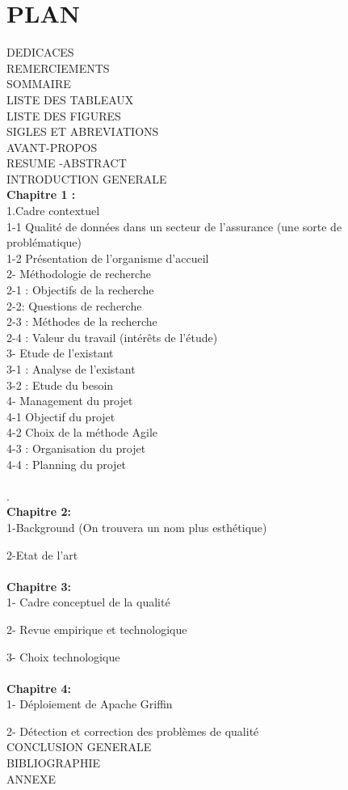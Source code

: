\documentclass[12pt,a4paper, fleqn]{report}
\begin{document}
\chapter*{PLAN}
DEDICACES\\
REMERCIEMENTS\\
SOMMAIRE\\
LISTE DES TABLEAUX\\
LISTE DES FIGURES\\
SIGLES ET ABREVIATIONS\\
AVANT-PROPOS\\
RESUME -ABSTRACT\\
INTRODUCTION GENERALE\\
\textbf{Chapitre 1 :}\\

1.Cadre contextuel\\
1-1 Qualité de données dans un secteur de l'assurance (une sorte de problématique)\\
1-2 Présentation de l'organisme d’accueil\\

2- Méthodologie de recherche\\                                          
2-1 : Objectifs de la recherche\\
2-2:  Questions de recherche\\
2-3 : Méthodes de la recherche\\
2-4 : Valeur du travail (intérêts de l’étude)\\

3- Etude de l'existant\\
3-1 : Analyse de l'existant\\
3-2 : Etude du besoin\\

4- Management du projet\\                                                                 
4-1 Objectif du projet\\
4-2 Choix de la méthode Agile\\
4-3 : Organisation du projet\\
4-4 : Planning du projet\\ \\
\newpage
.\\
\textbf{Chapitre 2:} \\

1-Background (On trouvera un nom plus esthétique)

2-Etat de l'art\\ \\
\textbf{Chapitre 3:}\\ 

1- Cadre conceptuel de la qualité

2- Revue empirique et technologique

3- Choix technologique\\ \\
\textbf{Chapitre 4:}\\

1- Déploiement de Apache Griffin

2- Détection et correction des problèmes de qualité\\
CONCLUSION GENERALE\\
BIBLIOGRAPHIE\\
ANNEXE\\
\end{document}
